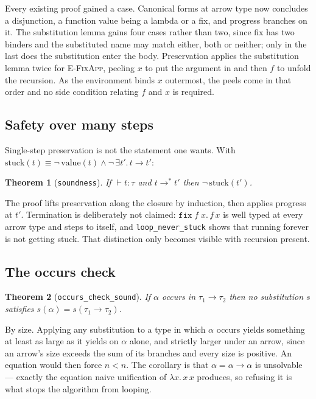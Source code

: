 \documentclass[11pt,a4paper]{article}
\newtheorem{theorem}{Theorem}
\newcommand{\step}{\longrightarrow}
\begin{document}
Every existing proof gained a case.  Canonical forms at arrow type now
concludes a disjunction, a function value being a lambda or a fix, and
progress branches on it.  The substitution lemma gains four cases rather than
two, since fix has two binders and the substituted name may match either, both
or neither; only in the last does the substitution enter the body.
Preservation applies the substitution lemma twice for \textsc{E-FixApp},
peeling $x$ to put the argument in and then $f$ to unfold the recursion.  As
the environment binds $x$ outermost, the peels come in that order and no side
condition relating $f$ and $x$ is required.

\subsection{Safety over many steps}

Single-step preservation is not the statement one wants.  With
$\mathrm{stuck}(t) \equiv \neg\,\mathrm{value}(t) \land
\neg\,\exists t'.\,t \step t'$:

\begin{theorem}[\texttt{soundness}]
  If $\vdash t : \tau$ and $t \step^{*} t'$ then $\neg\,\mathrm{stuck}(t')$.
\end{theorem}

The proof lifts preservation along the closure by induction, then applies
progress at $t'$.  Termination is deliberately not claimed:
$\mathtt{fix}\;f\;x.\,f\,x$ is well typed at every arrow type and steps to
itself, and \texttt{loop\_never\_stuck} shows that running forever is not
getting stuck.  That distinction only becomes visible with recursion present.

\subsection{The occurs check}

\begin{theorem}[\texttt{occurs\_check\_sound}]
  If $\alpha$ occurs in $\tau_1 \to \tau_2$ then no substitution $s$ satisfies
  $s(\alpha) = s(\tau_1 \to \tau_2)$.
\end{theorem}

By size.  Applying any substitution to a type in which $\alpha$ occurs yields
something at least as large as it yields on $\alpha$ alone, and strictly larger
under an arrow, since an arrow's size exceeds the sum of its branches and every
size is positive.  An equation would then force $n < n$.  The corollary is that
$\alpha = \alpha \to \alpha$ is unsolvable --- exactly the equation naive
unification of $\lambda x.\,x\,x$ produces, so refusing it is what stops the
algorithm from looping.
\end{document}
